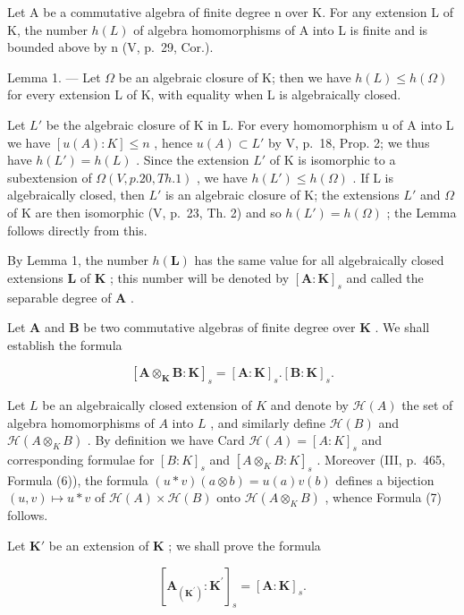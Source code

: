 Let A be a commutative algebra of finite degree n over K. For any extension L of K, the number \(h(L)\) of algebra homomorphisms of A into L is finite and is bounded above by n (V, p.~29, Cor.).

Lemma 1. --- Let \(\Omega\) be an algebraic closure of K; then we have \(h(L) \leqslant h(\Omega)\) for every extension L of K, with equality when L is algebraically closed.

Let \(L'\) be the algebraic closure of K in L. For every homomorphism u of A into L we have \([u(A):K] \leqslant n\) , hence \(u(A) \subset L'\) by V, p.~18, Prop. 2; we thus have \(h(L') = h(L)\) . Since the extension \(L'\) of K is isomorphic to a subextension of \(\Omega(V, p. 20, Th. 1)\) , we have \(h(L') \leqslant h(\Omega)\) . If L is algebraically closed, then \(L'\) is an algebraic closure of K; the extensions \(L'\) and \(\Omega\) of K are then isomorphic (V, p.~23, Th. 2) and so \(h(L') = h(\Omega)\) ; the Lemma follows directly from this.

By Lemma 1, the number \(h(\mathbf{L})\) has the same value for all algebraically closed extensions \(\mathbf{L}\) of \(\mathbf{K}\) ; this number will be denoted by \([\mathbf{A}:\mathbf{K}]_s\) and called the separable degree of \(\mathbf{A}\) .

Let \(\mathbf{A}\) and \(\mathbf{B}\) be two commutative algebras of finite degree over \(\mathbf{K}\) . We shall establish the formula

\[
[ \mathbf {A} \otimes_ {\mathbf {K}} \mathbf {B}: \mathbf {K} ] _ {s} = [ \mathbf {A}: \mathbf {K} ] _ {s}. [ \mathbf {B}: \mathbf {K} ] _ {s}.\tag{7}
\]

Let \(L\) be an algebraically closed extension of \(K\) and denote by \(\mathcal{H}(A)\) the set of algebra homomorphisms of \(A\) into \(L\) , and similarly define \(\mathcal{H}(B)\) and \(\mathcal{H}(A \otimes_K B)\) . By definition we have Card \(\mathcal{H}(A) = [A : K]_s\) and corresponding formulae for \([B:K]_{s}\) and \([A\otimes_{K}B:K]_{s}\) . Moreover (III, p.~465, Formula (6)), the formula \((u*v)(a\otimes b)=u(a)v(b)\) defines a bijection \((u,v)\mapsto u*v\) of \(\mathcal{H}(A)\times\mathcal{H}(B)\) onto \(\mathcal{H}(A\otimes_{K}B)\) , whence Formula (7) follows.

Let \(\mathbf{K}'\) be an extension of \(\mathbf{K}\) ; we shall prove the formula

\[
[ \mathbf {A} _ {(\mathbf {K} ^ {\prime})}: \mathbf {K} ^ {\prime} ] _ {s} = [ \mathbf {A}: \mathbf {K} ] _ {s}.\tag{8}
\]

